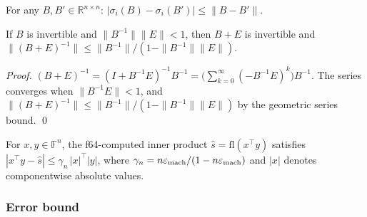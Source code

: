 \begin{fact}\label{fact:prefilter-weyl}
For any $B, B' \in \mathbb{R}^{n \times n}$:
$|\sigma_i(B) - \sigma_i(B')| \le \|B - B'\|$.
\end{fact}

\begin{fact}\label{fact:prefilter-banach}
If $B$ is invertible and $\|B^{-1}\|\|E\| < 1$, then
$B + E$ is invertible and
$\|(B+E)^{-1}\| \le \|B^{-1}\|/(1 - \|B^{-1}\|\|E\|)$.

\emph{Proof.}
$(B+E)^{-1} = (I + B^{-1}E)^{-1}B^{-1}
= \bigl(\sum_{k=0}^\infty (-B^{-1}E)^k\bigr)B^{-1}$.
The series converges when $\|B^{-1}E\| < 1$,
and $\|(B+E)^{-1}\| \le \|B^{-1}\|/(1 - \|B^{-1}\|\|E\|)$
by the geometric series bound. \qed
\end{fact}

\begin{fact}\label{fact:prefilter-dot}
For $x, y \in \mathbb{F}^n$, the f64-computed inner product
$\hat{s} = \mathrm{fl}(x^\top y)$ satisfies
$|x^\top y - \hat{s}| \le \gamma_n\, |x|^\top|y|$,
where $\gamma_n = n\varepsilon_{\mathrm{mach}}/(1 - n\varepsilon_{\mathrm{mach}})$
and $|x|$ denotes componentwise absolute values.
\end{fact}

\subsubsection*{Error bound}

